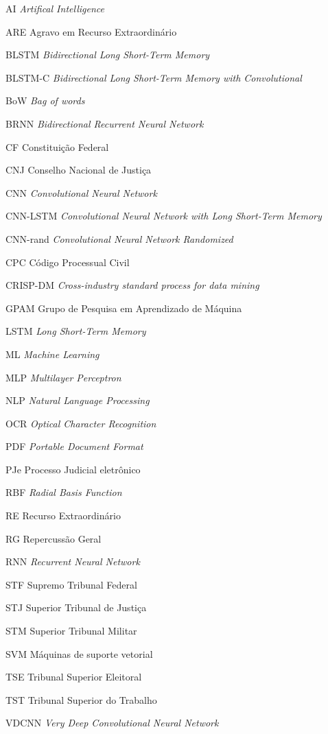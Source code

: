 \listoffigures*
\cleardoublepage
{}
\listoftables*
\cleardoublepage

\begin{siglas}
  \item[AI] \textit{Artifical Intelligence}
  \item[ARE] Agravo em Recurso Extraordinário
  \item[BLSTM] \textit{Bidirectional Long Short-Term Memory}
  \item[BLSTM-C] \textit{Bidirectional Long Short-Term Memory with Convolutional}
  \item[BoW] \textit{Bag of words}
  \item[BRNN] \textit{Bidirectional Recurrent Neural Network}
  \item[CF] Constituição Federal
  \item[CNJ] Conselho Nacional de Justiça
  \item[CNN] \textit{Convolutional Neural Network}
  \item[CNN-LSTM] \textit{Convolutional Neural Network with Long Short-Term Memory}
  \item[CNN-rand] \textit{Convolutional Neural Network Randomized}
  \item[CPC] Código Processual Civil
  \item[CRISP-DM] \textit{Cross-industry standard process for data mining}
  \item[GPAM] Grupo de Pesquisa em Aprendizado de Máquina
  \item[LSTM] \textit{Long Short-Term Memory}
  \item[ML] \textit{Machine Learning}
  \item[MLP] \textit{Multilayer Perceptron}
  \item[NLP] \textit{Natural Language Processing}
  \item[OCR] \textit{Optical Character Recognition}
  \item[PDF] \textit{Portable Document Format}
  \item[PJe] Processo Judicial eletrônico
  \item[RBF] \textit{Radial Basis Function}
  \item[RE] Recurso Extraordinário
  \item[RG] Repercussão Geral
  \item[RNN] \textit{Recurrent Neural Network}
  \item[STF] Supremo Tribunal Federal
  \item[STJ] Superior Tribunal de Justiça
  \item[STM] Superior Tribunal Militar
  \item[SVM] Máquinas de suporte vetorial
  \item[TSE] Tribunal Superior Eleitoral
  \item[TST] Tribunal Superior do Trabalho
  \item[VDCNN] \textit{Very Deep Convolutional Neural Network}
\end{siglas}


